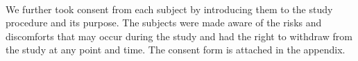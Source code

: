 \paragraph{}
We further took consent from each subject by introducing them to the study procedure and its purpose. The subjects were made aware of the risks and discomforts that may occur during the study and had the right to withdraw from the study at any point and time. The consent form is attached in the appendix.